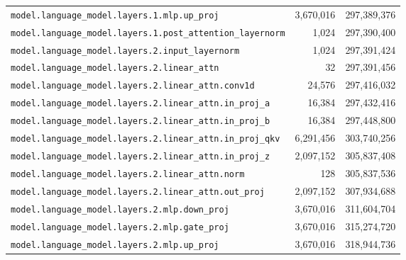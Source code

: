 \documentclass[10pt,a4paper]{article}
\theoremstyle{definition}
\begin{document}
\begin{appendices}
\begin{longtable}{p{9.5cm}rr}
\texttt{model.\allowbreak{}language\_model.\allowbreak{}layers.\allowbreak{}1.\allowbreak{}mlp.\allowbreak{}up\_proj} & 3,670,016 & 297,389,376 \\
\texttt{model.\allowbreak{}language\_model.\allowbreak{}layers.\allowbreak{}1.\allowbreak{}post\_attention\_layernorm} & 1,024 & 297,390,400 \\
\texttt{model.\allowbreak{}language\_model.\allowbreak{}layers.\allowbreak{}2.\allowbreak{}input\_layernorm} & 1,024 & 297,391,424 \\
\texttt{model.\allowbreak{}language\_model.\allowbreak{}layers.\allowbreak{}2.\allowbreak{}linear\_attn} & 32 & 297,391,456 \\
\texttt{model.\allowbreak{}language\_model.\allowbreak{}layers.\allowbreak{}2.\allowbreak{}linear\_attn.\allowbreak{}conv1d} & 24,576 & 297,416,032 \\
\texttt{model.\allowbreak{}language\_model.\allowbreak{}layers.\allowbreak{}2.\allowbreak{}linear\_attn.\allowbreak{}in\_proj\_a} & 16,384 & 297,432,416 \\
\texttt{model.\allowbreak{}language\_model.\allowbreak{}layers.\allowbreak{}2.\allowbreak{}linear\_attn.\allowbreak{}in\_proj\_b} & 16,384 & 297,448,800 \\
\texttt{model.\allowbreak{}language\_model.\allowbreak{}layers.\allowbreak{}2.\allowbreak{}linear\_attn.\allowbreak{}in\_proj\_qkv} & 6,291,456 & 303,740,256 \\
\texttt{model.\allowbreak{}language\_model.\allowbreak{}layers.\allowbreak{}2.\allowbreak{}linear\_attn.\allowbreak{}in\_proj\_z} & 2,097,152 & 305,837,408 \\
\texttt{model.\allowbreak{}language\_model.\allowbreak{}layers.\allowbreak{}2.\allowbreak{}linear\_attn.\allowbreak{}norm} & 128 & 305,837,536 \\
\texttt{model.\allowbreak{}language\_model.\allowbreak{}layers.\allowbreak{}2.\allowbreak{}linear\_attn.\allowbreak{}out\_proj} & 2,097,152 & 307,934,688 \\
\texttt{model.\allowbreak{}language\_model.\allowbreak{}layers.\allowbreak{}2.\allowbreak{}mlp.\allowbreak{}down\_proj} & 3,670,016 & 311,604,704 \\
\texttt{model.\allowbreak{}language\_model.\allowbreak{}layers.\allowbreak{}2.\allowbreak{}mlp.\allowbreak{}gate\_proj} & 3,670,016 & 315,274,720 \\
\texttt{model.\allowbreak{}language\_model.\allowbreak{}layers.\allowbreak{}2.\allowbreak{}mlp.\allowbreak{}up\_proj} & 3,670,016 & 318,944,736 \\

\end{longtable}
\end{appendices}
\end{document}
